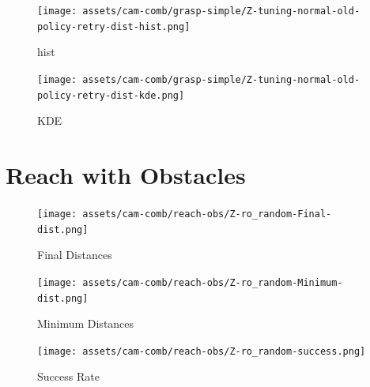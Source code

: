\begin{figure}[H]
  \centering
  \texttt{[image: assets/cam-comb/grasp-simple/Z-tuning-normal-old-policy-retry-dist-hist.png]}
  \caption{hist}
\end{figure}

\begin{figure}[H]
  \centering
  \texttt{[image: assets/cam-comb/grasp-simple/Z-tuning-normal-old-policy-retry-dist-kde.png]}
  \caption{KDE}
\end{figure}



\section{Reach with Obstacles}

\begin{figure}[H]
  \centering
  \texttt{[image: assets/cam-comb/reach-obs/Z-ro\_random-Final-dist.png]}
  \caption{Final Distances}
\end{figure}

\begin{figure}[H]
  \centering
  \texttt{[image: assets/cam-comb/reach-obs/Z-ro\_random-Minimum-dist.png]}
  \caption{Minimum Distances}
\end{figure}

\begin{figure}[H]
  \centering
  \texttt{[image: assets/cam-comb/reach-obs/Z-ro\_random-success.png]}
  \caption{Success Rate}
\end{figure}
